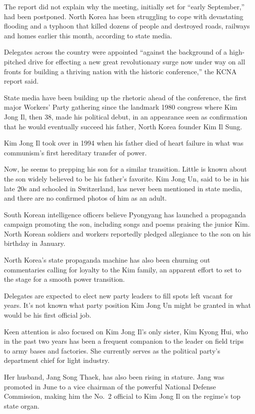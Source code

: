 ﻿\documentclass[12pt]{article}
\begin{document}
The report did not explain why the meeting, initially set for ``early September,'' had been
postponed. North Korea has been struggling to cope with devastating flooding and a typhoon that
killed dozens of people and destroyed roads, railways and homes earlier this month, according to
state media.

Delegates across the country were appointed ``against the background of a high-pitched drive for
effecting a new great revolutionary surge now under way on all fronts for building a thriving nation
with the historic conference,'' the KCNA report said.

State media have been building up the rhetoric ahead of the conference, the first major Workers'
Party gathering since the landmark 1980 congress where Kim Jong Il, then 38, made his political
debut, in an appearance seen as confirmation that he would eventually succeed his father, North
Korea founder Kim Il Sung.

Kim Jong Il took over in 1994 when his father died of heart failure in what was communism's first
hereditary transfer of power.

Now, he seems to prepping his son for a similar transition. Little is known about the son widely
believed to be his father's favorite. Kim Jong Un, said to be in his late 20s and schooled in
Switzerland, has never been mentioned in state media, and there are no confirmed photos of him as an
adult.

South Korean intelligence officers believe Pyongyang has launched a propaganda campaign promoting
the son, including songs and poems praising the junior Kim. North Korean soldiers and workers
reportedly pledged allegiance to the son on his birthday in January.

North Korea's state propaganda machine has also been churning out commentaries calling for loyalty
to the Kim family, an apparent effort to set to the stage for a smooth power transition.

Delegates are expected to elect new party leaders to fill spots left vacant for years. It's not
known what party position Kim Jong Un might be granted in what would be his first official job.

Keen attention is also focused on Kim Jong Il's only sister, Kim Kyong Hui, who in the past two
years has been a frequent companion to the leader on field trips to army bases and factories. She
currently serves as the political party's department chief for light industry.

Her husband, Jang Song Thaek, has also been rising in stature. Jang was promoted in June to a vice
chairman of the powerful National Defense Commission, making him the No.~2 official to Kim Jong Il
on the regime's top state organ.
\end{document}
